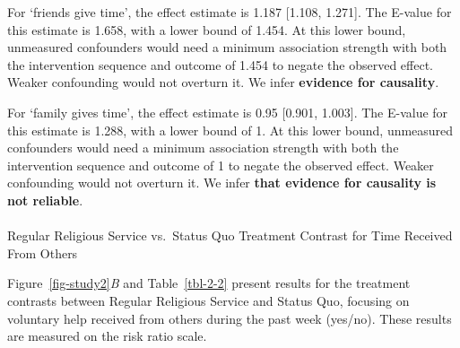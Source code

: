 \documentclass[
  single column]{article}
\makeatletter
\let\oldparagraph\paragraph
\renewcommand{\paragraph}{
    \@ifstar
      \xxxParagraphStar
      \xxxParagraphNoStar
  }
\newcommand{\xxxParagraphStar}[1]{\oldparagraph*{#1}\mbox{}}
\newcommand{\xxxParagraphNoStar}[1]{\oldparagraph{#1}\mbox{}}
\makeatother
\begin{document}
For `friends give time', the effect estimate is 1.187 {[}1.108,
1.271{]}. The E-value for this estimate is 1.658, with a lower bound of
1.454. At this lower bound, unmeasured confounders would need a minimum
association strength with both the intervention sequence and outcome of
1.454 to negate the observed effect. Weaker confounding would not
overturn it. We infer \textbf{evidence for causality}.

For `family gives time', the effect estimate is 0.95 {[}0.901, 1.003{]}.
The E-value for this estimate is 1.288, with a lower bound of 1. At this
lower bound, unmeasured confounders would need a minimum association
strength with both the intervention sequence and outcome of 1 to negate
the observed effect. Weaker confounding would not overturn it. We infer
\textbf{that evidence for causality is not reliable}.

\paragraph{Regular Religious Service vs.~Status Quo Treatment Contrast
for Time Received From
Others}\label{regular-religious-service-vs.-status-quo-treatment-contrast-for-time-received-from-others}

Figure~\ref{fig-study2}\emph{B} and Table~\ref{tbl-2-2} present results
for the treatment contrasts between Regular Religious Service and Status
Quo, focusing on voluntary help received from others during the past
week (yes/no). These results are measured on the risk ratio scale.
\end{document}
